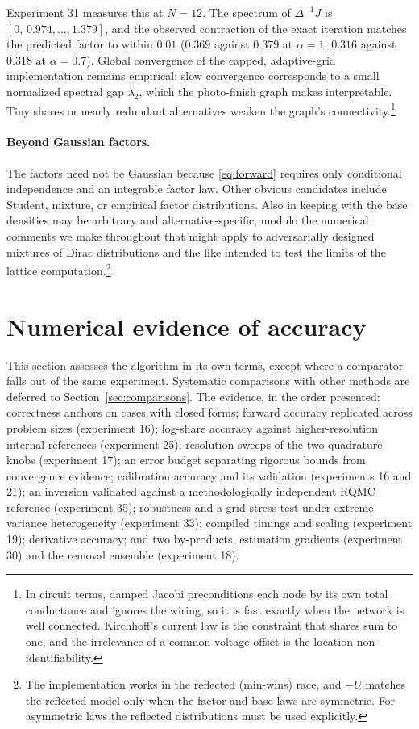 \documentclass[12pt]{article}
\theoremstyle{remark}
\begin{document}
Experiment 31 measures this at $N = 12$. The spectrum of $\Delta^{-1}J$ is
$[0,\, 0.974, \dots, 1.379]$, and the observed contraction of the
exact iteration matches the predicted factor to within $0.01$ ($0.369$
against $0.379$ at $\alpha = 1$; $0.316$ against $0.318$ at $\alpha =
0.7$). Global convergence of the capped, adaptive-grid implementation
remains empirical; slow convergence corresponds to a small normalized
spectral gap $\lambda_2$, which the photo-finish graph makes
interpretable. Tiny shares or nearly redundant alternatives weaken the
graph's connectivity.\footnote{In circuit terms, damped Jacobi
preconditions each node by its own total conductance and ignores the
wiring, so it is fast exactly when the network is well connected.
Kirchhoff's current law is the constraint that shares sum to one, and
the irrelevance of a common voltage offset is the location
non-identifiability.}

\paragraph{Beyond Gaussian factors.} The factors need not be Gaussian because \eqref{eq:forward} requires only
conditional independence and an integrable factor law. Other obvious candidates include Student, mixture,
or empirical factor distributions. Also in keeping with \citet{cotton2021} the base densities may be arbitrary and alternative-specific, modulo
the numerical comments we make throughout that might apply to adversarially designed mixtures of Dirac distributions and the like intended to test the 
limits of the lattice computation.\footnote{The implementation works in the reflected (min-wins) race,
and $-U$ matches the reflected model only when the factor and base laws
are symmetric. For asymmetric laws the reflected distributions must be
used explicitly.}

\section{Numerical evidence of accuracy}\label{sec:benchmark}

This section assesses the algorithm in its own terms, except where a
comparator falls out of the same experiment. Systematic comparisons
with other methods are deferred to Section~\ref{sec:comparisons}. The
evidence, in the order presented: correctness anchors on cases with
closed forms; forward accuracy replicated across problem sizes
(experiment 16); log-share accuracy against higher-resolution internal
references (experiment 25); resolution sweeps of the two quadrature
knobs (experiment 17); an error budget separating rigorous bounds from
convergence evidence; calibration accuracy and its validation
(experiments 16 and 21); an inversion validated against a
methodologically independent RQMC reference (experiment 35); robustness
and a grid stress test under extreme variance heterogeneity (experiment
33); compiled timings and scaling (experiment 19); derivative accuracy;
and two by-products, estimation gradients (experiment 30) and the
removal ensemble (experiment 18).
\end{document}
